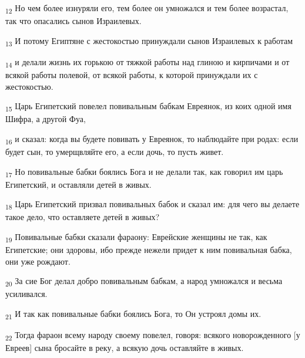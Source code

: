 \begin{tcolorbox}
\textsubscript{12} Но чем более изнуряли его, тем более он умножался и тем более возрастал, так что опасались сынов Израилевых.
\end{tcolorbox}
\begin{tcolorbox}
\textsubscript{13} И потому Египтяне с жестокостью принуждали сынов Израилевых к работам
\end{tcolorbox}
\begin{tcolorbox}
\textsubscript{14} и делали жизнь их горькою от тяжкой работы над глиною и кирпичами и от всякой работы полевой, от всякой работы, к которой принуждали их с жестокостью.
\end{tcolorbox}
\begin{tcolorbox}
\textsubscript{15} Царь Египетский повелел повивальным бабкам Евреянок, из коих одной имя Шифра, а другой Фуа,
\end{tcolorbox}
\begin{tcolorbox}
\textsubscript{16} и сказал: когда вы будете повивать у Евреянок, то наблюдайте при родах: если будет сын, то умерщвляйте его, а если дочь, то пусть живет.
\end{tcolorbox}
\begin{tcolorbox}
\textsubscript{17} Но повивальные бабки боялись Бога и не делали так, как говорил им царь Египетский, и оставляли детей в живых.
\end{tcolorbox}
\begin{tcolorbox}
\textsubscript{18} Царь Египетский призвал повивальных бабок и сказал им: для чего вы делаете такое дело, что оставляете детей в живых?
\end{tcolorbox}
\begin{tcolorbox}
\textsubscript{19} Повивальные бабки сказали фараону: Еврейские женщины не так, как Египетские; они здоровы, ибо прежде нежели придет к ним повивальная бабка, они уже рождают.
\end{tcolorbox}
\begin{tcolorbox}
\textsubscript{20} За сие Бог делал добро повивальным бабкам, а народ умножался и весьма усиливался.
\end{tcolorbox}
\begin{tcolorbox}
\textsubscript{21} И так как повивальные бабки боялись Бога, то Он устроял домы их.
\end{tcolorbox}
\begin{tcolorbox}
\textsubscript{22} Тогда фараон всему народу своему повелел, говоря: всякого новорожденного [у Евреев] сына бросайте в реку, а всякую дочь оставляйте в живых.
\end{tcolorbox}
